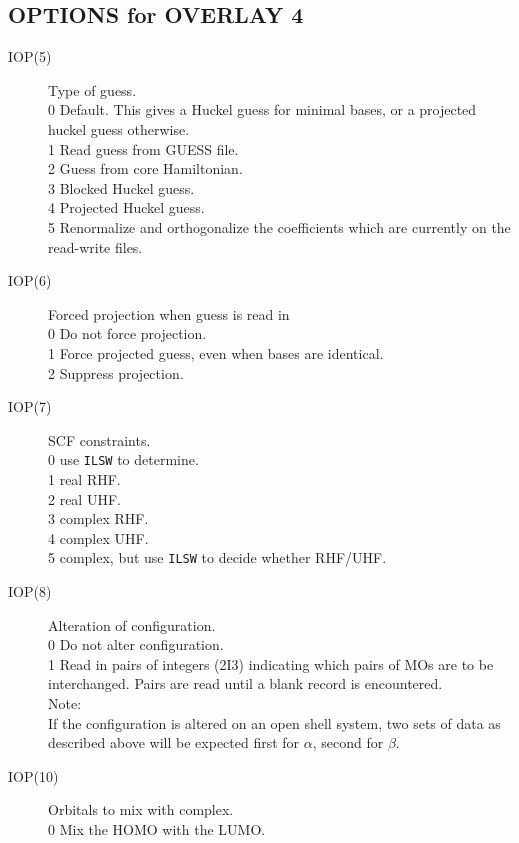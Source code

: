 \subsection{\sf OPTIONS for OVERLAY 4}
\begin{description}
\item[IOP(5)]  Type of guess.  \\
0  Default.  This gives a Huckel guess for minimal bases, or 
a projected huckel guess otherwise.  \\
1  Read guess from GUESS file. \\
2  Guess from core Hamiltonian. \\
3  Blocked Huckel guess. \\
4  Projected Huckel guess. \\
5  Renormalize and orthogonalize the coefficients which are 
currently on the read-write files. \\
\item[IOP(6)]  Forced projection when guess is read in  \\
0  Do not force projection. \\
1  Force projected guess, even when bases are identical. \\
2  Suppress projection. \\
\item[IOP(7)]  SCF constraints.  \\
0  use {\tt ILSW} to determine. \\
1  real RHF. \\
2  real UHF. \\
3  complex RHF. \\
4  complex UHF. \\
5  complex, but use {\tt ILSW} to decide whether RHF/UHF. \\
\item[IOP(8)]  Alteration of configuration.  \\
0  Do not alter configuration. \\
1  Read in pairs of integers (2I3) indicating which pairs of MOs 
are to be interchanged.  Pairs are read until a blank record is
encountered.  \\
Note:  \\
If the configuration is altered on an open shell system, two sets
of data as described above will be expected first for $\alpha$,
second for $\beta$.
\item[IOP(10)]  Orbitals to mix with complex.  \\
0  Mix the HOMO with the LUMO. \\

\end{description}
